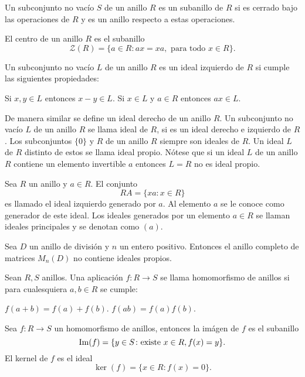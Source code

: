 \newpage
\begin{definicion}
Un subconjunto no vacío $S$ de un anillo $R$ es un subanillo de $R$ si es cerrado bajo las operaciones de $R$ y es un anillo respecto a estas operaciones.
\end{definicion}
\begin{definicion}
El centro de un anillo $R$ es el subanillo \[ \mathcal{Z}(R) = \{a \in R \colon ax = xa, \mbox{ para todo } x \in R \}. \]
\end{definicion}
\begin{definicion}
Un subconjunto no vacío $L$ de un anillo $R$ es un ideal izquierdo de $R$ si cumple las siguientes propiedades:
\begin{bulletList}
\newItem Si $x,y \in L$ entonces $x-y \in L$.
\newItem Si $x \in L$ y $a \in R$ entonces $ax \in L$.
\end{bulletList}
\end{definicion}
De manera similar se define un ideal derecho de un anillo $R$. Un subconjunto no vacío $L$ de un anillo $R$ se llama ideal de $R$, si es un ideal derecho e izquierdo de $R$. 
Los subconjuntos $\{0\}$ y $R$ de un anillo $R$ siempre son ideales de $R$. Un ideal $L$ de $R$ distinto de estos se llama ideal propio. Nótese que si un ideal $L$ de un anillo $R$ contiene un elemento invertible $a$ entonces $L=R$ no es ideal propio. 
\begin{definicion}
Sea $R$ un anillo y $a \in R$. El conjunto \[ RA = \{ xa \colon x \in R \} \] es llamado  el ideal izquierdo generado por $a$. Al elemento $a$ se le conoce como generador de este ideal. Los ideales generados por un elemento $a \in R$ se llaman ideales principales y se denotan como $(a)$.
\end{definicion}
\begin{proposicion}
Sea $D$ un anillo de división y $n$ un entero positivo. Entonces el anillo completo de matrices $M_n(D)$ no contiene ideales propios.
\end{proposicion}
\begin{definicion}
Sean $R, S$ anillos. Una aplicación $f \colon R \to S$ se llama homomorfismo de anillos si para cualesquiera $a,b \in R$ se cumple:
\begin{bulletList}
\newItem $f(a+b) = f(a) +f(b)$.
\newItem $f(ab) = f(a)f(b)$.
\end{bulletList}
\end{definicion}
\begin{definicion}
Sea $f \colon R \to S$ un homomorfismo de anillos, entonces la imágen de $f$ es el subanillo \[\operatorname{Im} (f) = \{ y \in S \colon \mbox{existe } x \in R, f(x)=y \}. \]
El kernel de $f$ es el ideal\[ \ker(f) = \{ x \in R \colon f(x) = 0 \}. \]
\end{definicion}
